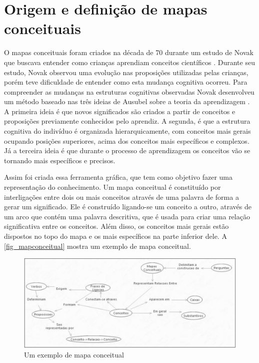 \documentclass[
	12pt,				%
	openright,			%
	oneside,			%
	a4paper,			%
	english,			%
	french,				%
	spanish,			%
	brazil				%
	]{abntex2}
\begin{document}
\section{Origem e definição de mapas conceituais}
O mapas conceituais foram criados na década de 70 durante um estudo de Novak que buscava entender como crianças aprendiam conceitos científicos \cite{Novak2005}. Durante seu estudo, Novak observou uma evolução nas proposições utilizadas pelas crianças, porém teve dificuldade de entender como esta mudança cognitiva ocorreu. Para compreender as mudanças na estruturas cognitivas observadas Novak desenvolveu um método baseado nas três ideias de Ausubel sobre a teoria da aprendizagem \cite{ausubel1963}. A primeira ideia é que novos significados são criados a partir de conceitos e proposições previamente conhecidos pelo aprendiz. A segunda, é que a estrutura cognitiva do indivíduo é organizada hierarquicamente, com conceitos mais gerais ocupando posições superiores, acima dos conceitos mais específicos e complexos. Já a terceira ideia é que durante o processo de aprendizagem os conceitos vão se tornando mais específicos e precisos.

Assim foi criada essa ferramenta gráfica, que tem como objetivo fazer uma representação do conhecimento. Um mapa conceitual é constituído por interligações entre dois ou mais conceitos através de uma palavra de forma a gerar um significado. Ele é construído ligando-se um conceito a outro, através de um arco que contém uma palavra descritiva, que é usada para criar uma relação significativa entre os conceitos. Além disso, os conceitos mais gerais estão dispostos no topo do mapa e os mais específicos na parte inferior dele. A \autoref{fig_mapconceitual} mostra um exemplo de mapa conceitual.
\begin{figure}[htb]
	\caption{\label{fig_mapconceitual}Um exemplo de mapa conceitual}
	\begin{center}
		\includegraphics[scale=0.3]{mapaconceitual.png}
	\end{center}
\end{figure}
\end{document}
